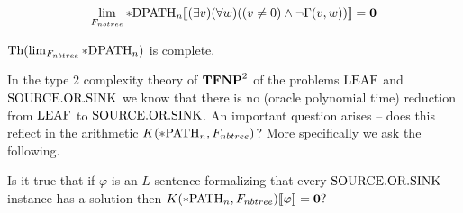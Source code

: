 \begin{thrm}
\[\lim_{F_{nbtree}}*\text{DPATH}_n\llbracket(\exists v)(\forall w)((v\not=0)\land \lnot\Gamma(v,w))\rrbracket=\textbf{0}\]
\end{thrm}

\begin{crll}\label{crllpDPATH}
$\text{Th}(\lim_{F_{nbtree}}*\text{DPATH}_n)$ is complete.
\end{crll}

In the type 2 complexity theory of $\textbf{TFNP}^2$ of the problems $\text{LEAF}$ and $\text{SOURCE.OR.SINK}$ we know that there is no (oracle polynomial time) reduction from $\text{LEAF}$ to $\text{SOURCE.OR.SINK}$. An important question arises -- does this reflect in the arithmetic $K(*\text{PATH}_n,F_{nbtree})$? More specifically we ask the following.

\begin{ques}
Is it true that if $\varphi$ is an $L$-sentence formalizing that every $\text{SOURCE.OR.SINK}$ instance has a solution then
$K(*\text{PATH}_n,F_{nbtree})\llbracket\varphi\rrbracket=\textbf{0}?$
\end{ques}
